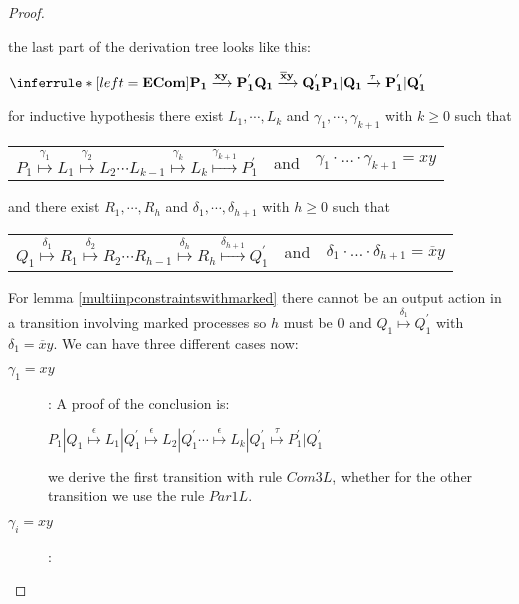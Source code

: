 \begin{proposition}
\begin{proof}
\begin{description}
	the last part of the derivation tree looks like this:
	\begin{center}
	  $\inferrule* [left=\bf{ECom}]{
	      P_{1} \xrightarrow{xy} P_{1}^{'}
	    \\
	      Q_{1} \xrightarrow{\overline{x}y} Q_{1}^{'}
	  }{
	    P_{1}|Q_{1} \xrightarrow{\tau} P_{1}^{'}|Q_{1}^{'}
	  }$
	\end{center}
	for inductive hypothesis there exist $L_{1}, \cdots, L_{k}$ and $\gamma_{1}, \cdots, \gamma_{k+1}$ with $k\geq 0$ such that 
	\begin{center}
	  \begin{tabular}{lll}
	    $P_{1} \stackrel{\gamma_{1}}{\longmapsto} L_{1}  \stackrel{\gamma_{2}}{\longmapsto} L_{2} \cdots L_{k-1} \stackrel{\gamma_{k}}{\longmapsto} L_{k} \stackrel{\gamma_{k+1}}{\longmapsto} P_{1}^{'}$ 
	  &
	    and
	  &
	    $\gamma_{1} \cdot \ldots \cdot \gamma_{k+1} = xy$
	  \end{tabular}
	\end{center}
	and there exist $R_{1}, \cdots, R_{h}$ and $\delta_{1}, \cdots, \delta_{h+1}$ with $h\geq 0$ such that 
	\begin{center}
	  \begin{tabular}{lll}
	    $Q_{1} \stackrel{\delta_{1}}{\longmapsto} R_{1}  \stackrel{\delta_{2}}{\longmapsto} R_{2} \cdots R_{h-1} \stackrel{\delta_{h}}{\longmapsto} R_{h} \stackrel{\delta_{h+1}}{\longmapsto} Q_{1}^{'}$ 
	  &
	    and
	  &
	    $\delta_{1} \cdot \ldots \cdot \delta_{h+1} = \overline{x}y$
	  \end{tabular}
	\end{center}
	For lemma \ref{multiinpconstraintswithmarked} there cannot be an output action in a transition involving marked processes so $h$ must be $0$ and $Q_{1} \stackrel{\delta_{1}}{\longmapsto} Q_{1}^{'}$ with $\delta_{1}=\overline{x}y$. We can have three different cases now: 
	\begin{description}
	  \item[$\gamma_{1}=xy$]:
	    A proof of the conclusion is:
	    \begin{center}
	      $P_{1}|Q_{1} \stackrel{\epsilon}{\longmapsto} L_{1}|Q_{1}^{'}
			      \stackrel{\epsilon}{\longmapsto} L_{2}|Q_{1}^{'}
		  \cdots
				\stackrel{\epsilon}{\longmapsto} L_{k}|Q_{1}^{'}
				\stackrel{\tau}{\longmapsto} P_{1}^{'}|Q_{1}^{'}$	  
	    \end{center}
	    we derive the first transition with rule $Com3L$, whether for the other transition we use the rule $Par1L$.
	  \item[$\gamma_{i}=xy$]:

\end{description}
\end{description}
\end{proof}
\end{proposition}
